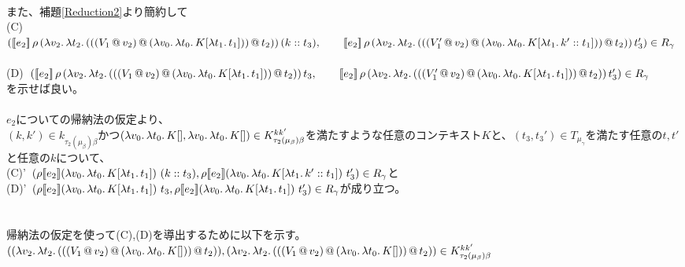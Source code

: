 \documentclass[japanese,draft]{jssst_ppl} %
\begin{document}
   \\
   また、補題\ref{Reduction2}より簡約して\\
 (C)\ $([\![{e_2}]\!]\,\rho\,(\lambda{v_2}.\,{\lambda{t_2}.\,{({({({V_1}\,@\,{v_2})}\,@\,{(\lambda{v_0}.\,{\lambda{t_0}.\,{K[\lambda{t_1}.\,{t_1}]}})})}\,@\,{t_2})}})\,(k::t_3),\\
   \qquad  [\![{e_2}]\!]\,\rho\,(\lambda{v_2}.\,{\lambda{t_2}.\,{({({({V_1'}\,@\,{v_2})}\,@\,{(\lambda{v_0}.\,{\lambda{t_0}.\,{K[\lambda{t_1}.\,{k'::t_1}]}})})}\,@\,{t_2})}})\,t_3')\in R_{\gamma}$\\
            \\
 (D)\ $([\![{e_2}]\!]\,\rho\,(\lambda{v_2}.\,{\lambda{t_2}.\,{({({({V_1}\,@\,{v_2})}\,@\,{(\lambda{v_0}.\,{\lambda{t_0}.\,{K[\lambda{t_1}.\,{t_1}]}})})}\,@\,{t_2})}})\,t_3,\\
   \qquad  [\![{e_2}]\!]\,\rho\,(\lambda{v_2}.\,{\lambda{t_2}.\,{({({({V_1'}\,@\,{v_2})}\,@\,{(\lambda{v_0}.\,{\lambda{t_0}.\,{K[\lambda{t_1}.\,{t_1}]}})})}\,@\,{t_2})}})\,t_3')\in R_{\gamma}$\\
  を示せば良い。\\
  \\
  $e_2$についての帰納法の仮定より、\\
  $(k,k')\in k_{\tau_2(\mu_{\beta})\beta}$かつ$(\lambda{v_0}.\,{\lambda{t_0}.\,{K[]}}, \lambda{v_0}.\,{\lambda{t_0}.\,{K[]}})\in  K^{kk'}_{\tau_2(\mu_{\beta})\beta}$を満たすような任意のコンテキスト$K$と、$(t_3, t_3') \in T_{\mu_{\gamma}}$を満たす任意の$t, t'$と任意の$k$について、\\
  (C)'\ $(\rho \CPSTh{e_2} \LamP{v_0}{\Lam{t_0}{K[\Lam{t_1}{t_1}]}}\ (\Cons{k}{t_3}), \rho \CPSTh{e_2} \LamP{v_0}{\Lam{t_0}{K[\Lam{t_1}{\Cons{k'}{t_1}}]}}\ t_3')\in R_{\gamma}$と\\
  (D)'\ $(\rho [\![{e_2}]\!] (\lambda{v_0}.\,{\lambda{t_0}.\,{K[\lambda{t_1}.\,{t_1}]}})\ t_3, \rho [\![{e_2}]\!] (\lambda{v_0}.\,{\lambda{t_0}.\,{K[\lambda{t_1}.\,{t_1}]}})\ t_3')\in R_{\gamma}$が成り立つ。\\
  \\
  \\
  帰納法の仮定を使って(C),(D)を導出するために以下を示す。\\
  $((\lambda{v_2}.\,{\lambda{t_2}.\,{({({({V_1}\,@\,{v_2})}\,@\,{(\lambda{v_0}.\,{\lambda{t_0}.\,{K[]}})})}\,@\,{t_2})}}),\\
   (\lambda{v_2}.\,{\lambda{t_2}.\,{({({({V_1}\,@\,{v_2})}\,@\,{(\lambda{v_0}.\,{\lambda{t_0}.\,{K[]}})})}\,@\,{t_2})}})\in K^{kk'}_{\tau_2(\mu_{\beta})\beta}$\\
\end{document}
